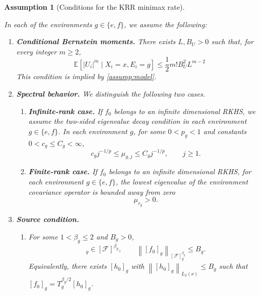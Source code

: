 \documentclass[11pt]{article}
\newtheorem{assumption}{Assumption}
\newcommand{\E}{\mathbb{E}}
\newcommand{\F}{\mathcal{F}}
\newcommand{\norm}[1]{\left\lVert #1\right\rVert}
\begin{document}
\begin{assumption}[Conditions for the KRR minimax rate]\label{assump:krr}

In each of the environments $g \in \{e,f\}$, we assume the following:

\begin{enumerate}[label=(\alph*),leftmargin=2.2em]
  \item \textbf{Conditional Bernstein moments.} There exists $L,B_U>0$ such that, for every integer $m\ge2$,
  \begin{equation}
    \E[|U_i|^m\mid X_i=x,E_i=g]
    \le \frac12m!B_U^2L^{m-2}
    \label{eq:bernstein_moments}
  \end{equation}
 This condition is implied by \ref{assump:model}.

  \item \textbf{Spectral behavior.} We distinguish the following two cases.
  \begin{enumerate}[label=(\roman*),leftmargin=2.2em]
    \item \textbf{Infinite-rank case.} If $f_0$ belongs to an infinite dimensional RKHS, we assume the two-sided eigenvalue decay condition in each environment $g \in \{e,f\}$. In each environment $g$, for some $0<p_g<1$ and constants $0<c_g\le C_g<\infty$,
    \begin{equation}
      c_g j^{-1/p}\le\mu_{g,j}\le C_gj^{-1/p},\qquad j\ge1.
      \label{eq:eigen_decay}
    \end{equation}

    \item \textbf{Finite-rank case.} If $f_0$ belongs to an infinite dimensional RKHS,  for each environment $g \in \{e,f\}$, the lowest eigenvalue of the environment covariance operator is bounded away from zero 
    \begin{equation}
      \mu_{r_g}>0.
      \label{eq:finite_spectral_gap}
    \end{equation}

  \end{enumerate}

  \item \textbf{Source condition.}
  \begin{enumerate}[label=(\roman*),leftmargin=2.2em]
    \item  For some $1<\beta_g\le2$ and $B_g>0$,
    \begin{equation}
      [f_0]_g\in[\F]^{\beta_g},\qquad
      \norm{[f_0]_g}_{[\F]^{\beta_g}_g}\le B_g.
      \label{eq:source_condition}
    \end{equation}
    Equivalently, there exists $[h_0]_g$ with $\norm{[h_0]_g}_{L_2(\nu)}\le B_g$ such that $[f_0]_g=T_g^{{\beta_g}/2}[h_0]_g$.
  \end{enumerate}
\end{enumerate}
\end{assumption}
\end{document}
